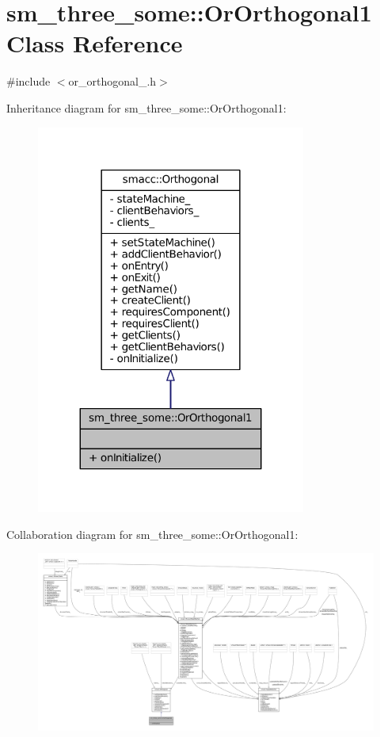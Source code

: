 \hypertarget{classsm__three__some_1_1OrOrthogonal1}{}\section{sm\+\_\+three\+\_\+some\+:\+:Or\+Orthogonal1 Class Reference}
\label{classsm__three__some_1_1OrOrthogonal1}


{\ttfamily \#include $<$or\+\_\+orthogonal\+\_.\+h$>$}



Inheritance diagram for sm\+\_\+three\+\_\+some\+:\+:Or\+Orthogonal1\+:
\nopagebreak
\begin{figure}[H]
\begin{center}
\leavevmode
\includegraphics[width=251pt]{classsm__three__some_1_1OrOrthogonal1__inherit__graph}
\end{center}
\end{figure}


Collaboration diagram for sm\+\_\+three\+\_\+some\+:\+:Or\+Orthogonal1\+:
\nopagebreak
\begin{figure}[H]
\begin{center}
\leavevmode
\includegraphics[width=350pt]{classsm__three__some_1_1OrOrthogonal1__coll__graph}
\end{center}
\end{figure}
